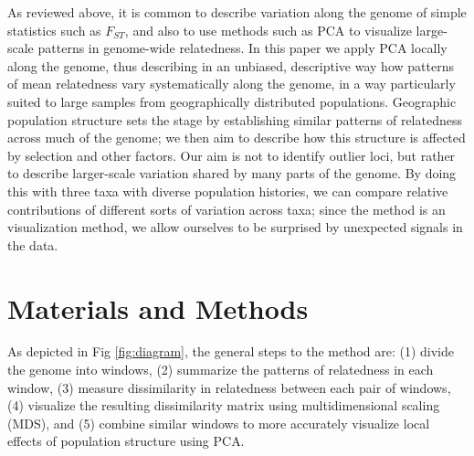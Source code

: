 \documentclass[11pt, oneside]{article}   	%
\newcommand{\Figure}{Fig }
\newcommand{\Figure}{{Figure }}
\begin{document}
As reviewed above,
it is common to describe variation along the genome of simple statistics such as $F_{ST}$,
and also to use methods such as PCA to visualize large-scale patterns in genome-wide relatedness.
In this paper we 
apply PCA locally along the genome,
thus describing in an unbiased, descriptive way
how patterns of mean relatedness vary systematically along the genome, 
in a way particularly suited to large samples from geographically distributed populations.
Geographic population structure sets the stage by establishing similar patterns of relatedness across much of the genome;
we then aim to describe how this structure is affected by selection and other factors.
Our aim is not to identify outlier loci,
but rather to describe larger-scale variation shared by many parts of the genome.
By doing this with three taxa with diverse population histories,
we can compare relative contributions of different sorts of variation across taxa;
since the method is an visualization method, 
we allow ourselves to be surprised by unexpected signals in the data.


\section{Materials and Methods}


As depicted in \Figure \ref{fig:diagram}, the general steps to the method are:
(1) divide the genome into windows,
(2) summarize the patterns of relatedness in each window,
(3) measure dissimilarity in relatedness between each pair of windows,
(4) visualize the resulting dissimilarity matrix using multidimensional scaling (MDS),
and (5) combine similar windows to more accurately visualize local effects of population structure using PCA.
\end{document}

